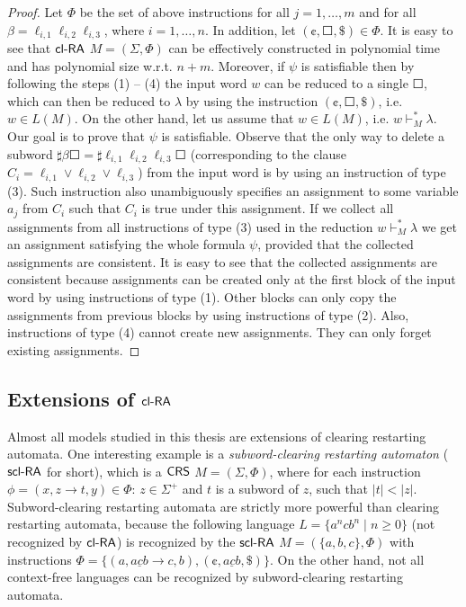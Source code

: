 \begin{proof}
Let $\Phi$ be the set of above instructions for all $j = 1, \ldots, m$ and for all $\beta = \ell_{i,1} \ell_{i,2} \ell_{i,3}$, where $i = 1, \ldots, n$. In addition, let $(\cent, \Square, \$) \in \Phi$. It is easy to see that $\mbox{\sf cl-RA\/}$ $M = (\Sigma, \Phi)$ can be effectively constructed in polynomial time and has polynomial size w.r.t. $n + m$. Moreover, if $\psi$ is satisfiable then by following the steps (1) -- (4) the input word $w$ can be reduced to a single $\Square$, which can then be reduced to $\lambda$ by using the instruction $(\cent, \Square, \$)$, i.e. $w \in L(M)$. On the other hand, let us assume that $w \in L(M)$, i.e. $w \vdash_M^* \lambda$. Our goal is to prove that $\psi$ is satisfiable. Observe that the only way to delete a subword $\sharp \beta \Square = \sharp \ell_{i,1} \ell_{i,2} \ell_{i,3} \Square$ (corresponding to the clause $C_i = \ell_{i,1} \vee \ell_{i,2} \vee \ell_{i,3}$) from the input word is by using an instruction of type (3). Such instruction also unambiguously specifies an assignment to some variable $a_j$ from $C_i$ such that $C_i$ is true under this assignment. If we collect all assignments from all instructions of type (3) used in the reduction $w \vdash_M^* \lambda$ we get an assignment satisfying the whole formula $\psi$, provided that the collected assignments are consistent. It is easy to see that the collected assignments are consistent because assignments can be created only at the first block of the input word by using instructions of type (1). Other blocks can only copy the assignments from previous blocks by using instructions of type (2). Also, instructions of type (4) cannot create new assignments. They can only forget existing assignments.
\end{proof}

\subsection{Extensions of $\mbox{\sf cl-RA\/}$}\label{clra_extensions}

Almost all models studied in this thesis are extensions of clearing restarting automata. One interesting example is a \emph{subword-clearing restarting automaton} (\emph{$\mbox{\sf scl-RA}$} for short), which is a $\mbox{\sf CRS\/}$ $M = (\Sigma, \Phi)$, where for each instruction  $\phi = (x, z \to t, y) \in \Phi$: $z \in \Sigma^+$ and $t$ is a subword of $z$, such that $|t| < |z|$. Subword-clearing restarting automata are strictly more powerful than clearing restarting automata, because the following language $L = \{a^n c b^n \mid n \ge 0\}$ (not recognized by $\mbox{\sf cl-RA\/}$) is recognized by the $\mbox{\sf scl-RA}$ $M = (\{a, b, c\}, \Phi)$ with instructions $\Phi = \{(a, \underline{acb} \to c, b), (\cent, \underline{acb}, \$)\}$. On the other hand, not all context-free languages can be recognized by subword-clearing restarting automata. 

